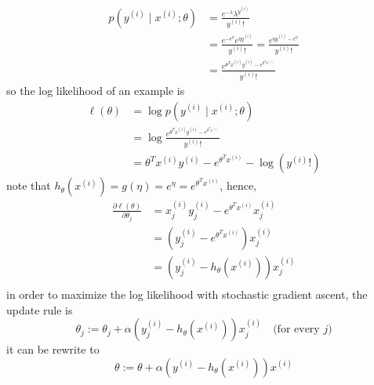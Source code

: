 \begin{answer}
    $$
    \begin{aligned}
        p(y^{(i)}\mid x^{(i)};\theta) &= \frac{e^{-\lambda}\lambda^{y^{(i)}}}{y^{(i)}!}      \\
        &= \frac{e^{-e^{\eta}}e^{\eta y^{(i)}}}{y^{(i)}!} = \frac{e^{\eta y^{(i)}- e^{\eta}}}{y^{(i)}!}\\
        &=\frac{e^{\theta^T x^{(i)}  y^{(i)}- e^{\theta^T x^{(i)}}}}{y^{(i)}!}
    \end{aligned}
    $$
    so the log likelihood of an example is
    $$
    \begin{aligned}
        \ell(\theta)
        &= \log  p(y^{(i)}\mid x^{(i)};\theta)\\
        &= \log \frac{e^{\theta^T x^{(i)}  y^{(i)}- e^{\theta^T x^{(i)}}}}{y^{(i)}!}\\
        &= \theta^T x^{(i)}  y^{(i)}- e^{\theta^T x^{(i)}} - \log{(y^{(i)}!)}
    \end{aligned}
    $$
    note that $h_\theta(x^{(i)}) = g(\eta) = e^{\eta}= e^{\theta^T x^{(i)}}$, hence,
    $$
    \begin{aligned}
        \frac{\partial \ell(\theta)}{\partial \theta_j} 
        &= x^{(i)}_j y^{(i)}_j - e^{\theta^T x^{(i)}}x^{(i)}_j \\
        &= (y^{(i)}_j - e^{\theta^T x^{(i)}})x^{(i)}_j\\
        &= (y^{(i)}_j - h_\theta(x^{(i)}))x^{(i)}_j\\
    \end{aligned}
    $$
    in order to maximize the log likelihood with stochastic gradient ascent, the update rule is
    $$
    \theta_j:=\theta_j + \alpha (y^{(i)}_j - h_\theta(x^{(i)}))x^{(i)}_j \quad\text{(for every $j$)}
    $$
    it can be rewrite to
    $$
    \theta:=\theta + \alpha (y^{(i)} - h_\theta(x^{(i)}))x^{(i)} 
    $$
\end{answer}

